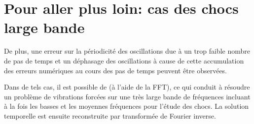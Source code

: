 









\medskip
\section{Pour aller plus loin: cas des chocs large bande}


\medskip
{}
De plus, une erreur sur la périodicité des oscillations due à un trop faible nombre de pas de temps et
un déphasage des oscillations à cause de cette accumulation des erreurs numériques au cours des pas
de temps peuvent être observées.

Dans de tels cas, il est possible de 
(à l'aide de la FFT),  ce qui conduit à résoudre un problème de vibrations forcées sur une très large bande
de fréquences incluant à la fois les basses et les moyennes fréquences pour l'étude des chocs.
La solution temporelle est ensuite reconstruite par transformée de Fourier
inverse.

